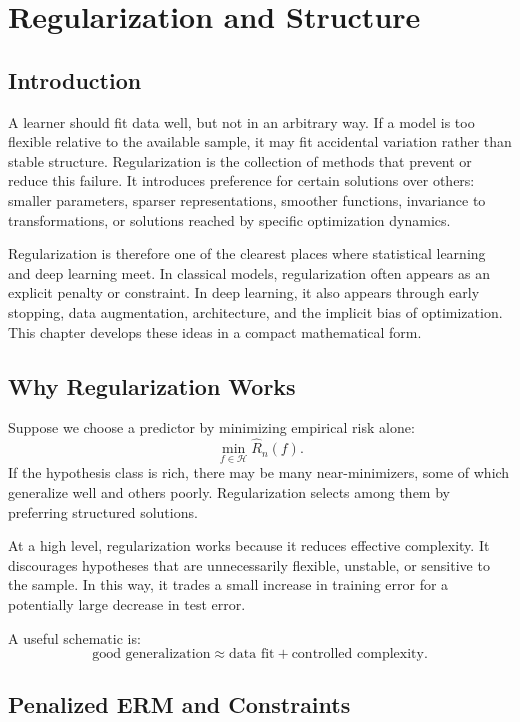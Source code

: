 \chapter{Regularization and Structure}

\section{Introduction}

A learner should fit data well, but not in an arbitrary way. If a model is too flexible relative to the available sample, it may fit accidental variation rather than stable structure. Regularization is the collection of methods that prevent or reduce this failure. It introduces preference for certain solutions over others: smaller parameters, sparser representations, smoother functions, invariance to transformations, or solutions reached by specific optimization dynamics.

Regularization is therefore one of the clearest places where statistical learning and deep learning meet. In classical models, regularization often appears as an explicit penalty or constraint. In deep learning, it also appears through early stopping, data augmentation, architecture, and the implicit bias of optimization. This chapter develops these ideas in a compact mathematical form.

\section{Why Regularization Works}

Suppose we choose a predictor by minimizing empirical risk alone:
\[
\min_{f\in\mathcal H} \widehat R_n(f).
\]
If the hypothesis class is rich, there may be many near-minimizers, some of which generalize well and others poorly. Regularization selects among them by preferring structured solutions.

At a high level, regularization works because it reduces effective complexity. It discourages hypotheses that are unnecessarily flexible, unstable, or sensitive to the sample. In this way, it trades a small increase in training error for a potentially large decrease in test error.

A useful schematic is:
\[
\text{good generalization} \approx \text{data fit} + \text{controlled complexity}.
\]

\section{Penalized ERM and Constraints}

